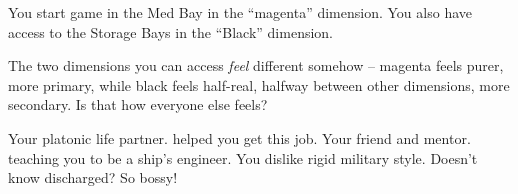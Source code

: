 \documentclass[char]{TMFHope}
\begin{document}
\begin{itemz}[Notes]
	\item You start game in the Med Bay in the ``magenta'' dimension. You also have access to the Storage Bays in the ``Black'' dimension.
	\item The two dimensions you can access {\em feel} different somehow -- magenta feels purer, more primary, while black feels half-real, halfway between other dimensions, more secondary.  Is that how everyone else feels?
\end{itemz}

\begin{contacts}
	\contact{\cNav{}} Your platonic life partner. \cNav{\They} helped you get this job.
	\contact{\cEng{}} Your friend and mentor. \cEng{\They} \cEng{\are} teaching you to be a ship's engineer.
	\contact{\cCap{}} You dislike \cCap{\their} rigid military style. Doesn't \cCap{} know \cCap{\they} \cCap{\were} discharged? So bossy!
\end{contacts}
\end{document}
